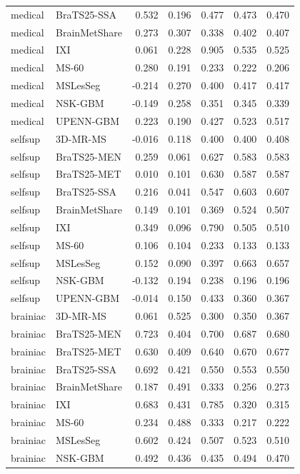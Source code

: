 \begin{tabular}{llrrrrr}
medical & BraTS25-SSA & 0.532 & 0.196 & 0.477 & 0.473 & 0.470 \\
medical & BrainMetShare & 0.273 & 0.307 & 0.338 & 0.402 & 0.407 \\
medical & IXI & 0.061 & 0.228 & 0.905 & 0.535 & 0.525 \\
medical & MS-60 & 0.280 & 0.191 & 0.233 & 0.222 & 0.206 \\
medical & MSLesSeg & -0.214 & 0.270 & 0.400 & 0.417 & 0.417 \\
medical & NSK-GBM & -0.149 & 0.258 & 0.351 & 0.345 & 0.339 \\
medical & UPENN-GBM & 0.223 & 0.190 & 0.427 & 0.523 & 0.517 \\
selfsup & 3D-MR-MS & -0.016 & 0.118 & 0.400 & 0.400 & 0.408 \\
selfsup & BraTS25-MEN & 0.259 & 0.061 & 0.627 & 0.583 & 0.583 \\
selfsup & BraTS25-MET & 0.010 & 0.101 & 0.630 & 0.587 & 0.587 \\
selfsup & BraTS25-SSA & 0.216 & 0.041 & 0.547 & 0.603 & 0.607 \\
selfsup & BrainMetShare & 0.149 & 0.101 & 0.369 & 0.524 & 0.507 \\
selfsup & IXI & 0.349 & 0.096 & 0.790 & 0.505 & 0.510 \\
selfsup & MS-60 & 0.106 & 0.104 & 0.233 & 0.133 & 0.133 \\
selfsup & MSLesSeg & 0.152 & 0.090 & 0.397 & 0.663 & 0.657 \\
selfsup & NSK-GBM & -0.132 & 0.194 & 0.238 & 0.196 & 0.196 \\
selfsup & UPENN-GBM & -0.014 & 0.150 & 0.433 & 0.360 & 0.367 \\
brainiac & 3D-MR-MS & 0.061 & 0.525 & 0.300 & 0.350 & 0.367 \\
brainiac & BraTS25-MEN & 0.723 & 0.404 & 0.700 & 0.687 & 0.680 \\
brainiac & BraTS25-MET & 0.630 & 0.409 & 0.640 & 0.670 & 0.677 \\
brainiac & BraTS25-SSA & 0.692 & 0.421 & 0.550 & 0.553 & 0.550 \\
brainiac & BrainMetShare & 0.187 & 0.491 & 0.333 & 0.256 & 0.273 \\
brainiac & IXI & 0.683 & 0.431 & 0.785 & 0.320 & 0.315 \\
brainiac & MS-60 & 0.234 & 0.488 & 0.333 & 0.217 & 0.222 \\
brainiac & MSLesSeg & 0.602 & 0.424 & 0.507 & 0.523 & 0.510 \\
brainiac & NSK-GBM & 0.492 & 0.436 & 0.435 & 0.494 & 0.470 \\

\end{tabular}

